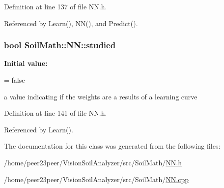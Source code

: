Definition at line 137 of file N\+N.\+h.



Referenced by Learn(), N\+N(), and Predict().

\hypertarget{class_soil_math_1_1_n_n_aed36297c9221a837fee94f4774b614bf}{}
\subsubsection[{studied}]{\setlength{\rightskip}{0pt plus 5cm}bool Soil\+Math\+::\+N\+N\+::studied\hspace{0.3cm}{\ttfamily [private]}}\label{class_soil_math_1_1_n_n_aed36297c9221a837fee94f4774b614bf}
{\bfseries Initial value\+:}
\begin{DoxyCode}
=
      \textcolor{keyword}{false}
\end{DoxyCode}
a value indicating if the weights are a results of a learning curve 

Definition at line 141 of file N\+N.\+h.



Referenced by Learn().



The documentation for this class was generated from the following files\+:\begin{DoxyCompactItemize}
\item 
/home/peer23peer/\+Vision\+Soil\+Analyzer/src/\+Soil\+Math/\hyperlink{_n_n_8h}{N\+N.\+h}\item 
/home/peer23peer/\+Vision\+Soil\+Analyzer/src/\+Soil\+Math/\hyperlink{_n_n_8cpp}{N\+N.\+cpp}\end{DoxyCompactItemize}
